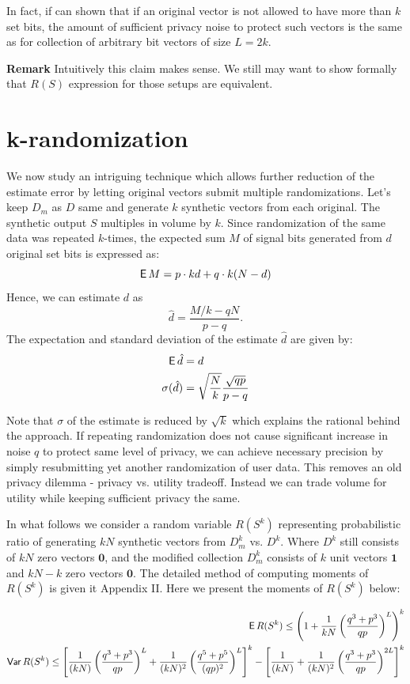 \documentclass[11pt]{article}
\newcommand{\zv}{\textbf{0}}
\newcommand{\uv}{\textbf{1}}
\begin{document}
In fact, if can shown that if an original vector is not allowed to have more than $k$ set bits, the amount of sufficient privacy noise to protect such vectors is the same as for collection of arbitrary bit vectors of size $L = 2k$. 

\textbf{Remark}  Intuitively this claim makes sense.  We still may want to show formally that $R(S)$ expression for those setups are equivalent. 

\section{k-randomization}

We now study an intriguing technique which allows further reduction of the estimate error by letting original vectors submit multiple randomizations.  Let's keep $D_m$ as  $D$ same and generate $k$ synthetic vectors from each original.  The synthetic output $S$ multiples in volume by $k$.  Since randomization of the same data was repeated $k$-times, the expected sum $M$ of signal bits generated from $d$ original set bits is expressed as:
\[ \operatorname{\mathsf{E}} M = p \cdot kd + q \cdot k(N-d) \]
Hence, we can estimate $d$ as
\[ \hat{d} = \frac{M/k-qN}{p-q}. \]
The expectation and standard deviation of the estimate $\hat{d}$ are given by:
\begin{align*}
\operatorname{\mathsf{E}} \hat{d} &= d \\
\sigma( \hat{d}) & = \sqrt{\frac{N}{k}} \frac{\sqrt{qp}}{p-q}
\end{align*}

Note that $\sigma$ of the estimate is reduced by $\sqrt{k}$ which explains the rational behind the approach.  If repeating randomization does not cause significant increase in noise $q$ to protect same level of privacy, we can achieve necessary precision by simply resubmitting yet another randomization of user data.  This removes an old privacy dilemma - privacy vs. utility tradeoff.  Instead we can trade volume for utility while keeping sufficient privacy the same.

In what follows we consider a random variable $R(S^k)$ representing probabilistic ratio of generating $kN$ synthetic vectors from $D^k_m$ vs. $D^k$.  Where $D^k$ still consists of $kN$ zero vectors $\zv$, and  the modified collection $D^k_m$ consists of $k$ unit vectors $\uv$ and $kN - k$ zero vectors $\zv$.  The detailed method of computing moments of $ R(S^k)$ is given it Appendix II.   Here we present the moments of $R(S^k)$ below:

\begin{align}
\operatorname{\mathsf{E}} R(S^k)  \le  \left ( 1 +  \frac{ 1 }{kN} \left ( \frac{q^3 + p^3} {qp} \right )^{L} \right )^k \\
\operatorname{\mathsf{Var}} R(S^k) \le \left [  \frac{1}  {(kN)} \left ( \frac{q^3 + p^3} {qp} \right )^L +   \frac{1} {(kN)^{2}}  \left ( \frac{q^5 + p^5} {(qp)^2} \right )^{L}  \right ]^k -  \left [  \frac{1}  {(kN)} +   \frac{1} {(kN)^{2}}  \left ( \frac{q^3 + p^3} {qp} \right )^{2L}  \right ]^k
\end{align}
\end{document}
